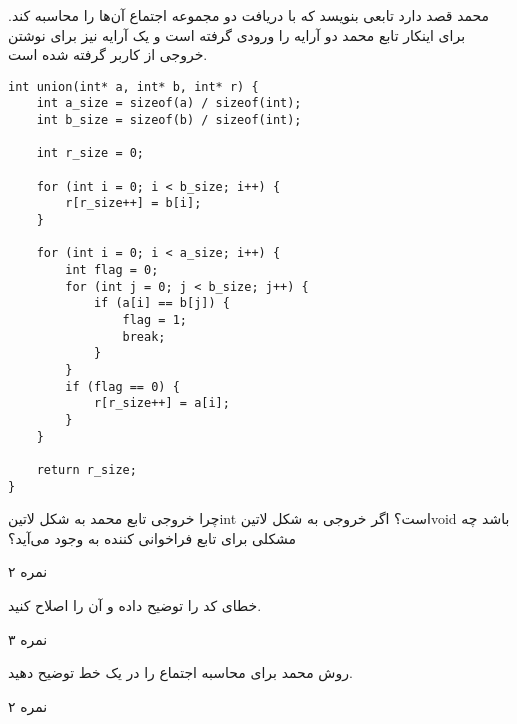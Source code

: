 
محمد قصد دارد تابعی بنویسد که با دریافت دو مجموعه اجتماع آن‌ها را محاسبه کند.
برای اینکار تابع محمد دو آرایه را ورودی گرفته است
و یک آرایه نیز برای نوشتن خروجی از کاربر گرفته شده است.

\begin{latin}
\begin{verbatim}
int union(int* a, int* b, int* r) {
    int a_size = sizeof(a) / sizeof(int);
    int b_size = sizeof(b) / sizeof(int);

    int r_size = 0;

    for (int i = 0; i < b_size; i++) {
        r[r_size++] = b[i];
    }

    for (int i = 0; i < a_size; i++) {
        int flag = 0;
        for (int j = 0; j < b_size; j++) {
            if (a[i] == b[j]) {
                flag = 1;
                break;
            }
        }
        if (flag == 0) {
            r[r_size++] = a[i];
        }
    }

    return r_size;
}
\end{verbatim}
\end{latin}

چرا خروجی تابع محمد به شکل ‌لاتین{int} است؟
اگر خروجی به شکل ‌لاتین{void} باشد چه مشکلی برای تابع فراخوانی کننده به وجود می‌آید؟

۲ نمره

خطای کد را توضیح داده و آن را اصلاح کنید.

۳ نمره

روش محمد برای محاسبه اجتماع را در یک خط توضیح دهید.

۲ نمره


